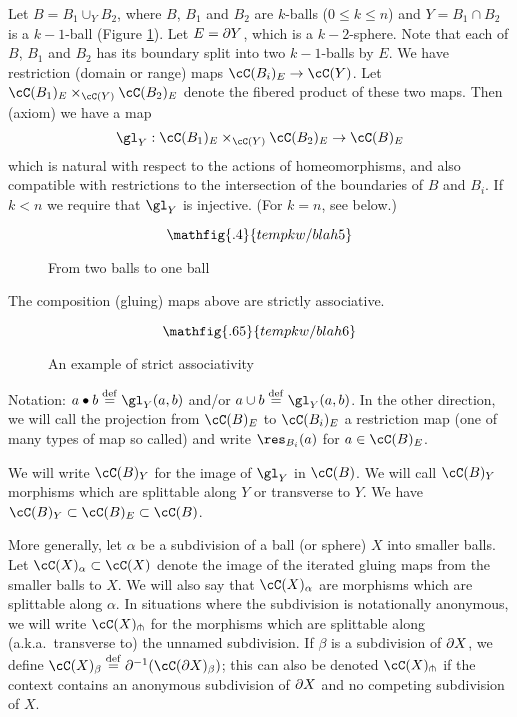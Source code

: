 \begin{axiom}[Composition]
Let $B = B_1 \cup_Y B_2$, where $B$, $B_1$ and $B_2$ are $k$-balls ($0\le k\le n$)
and $Y = B_1\cap B_2$ is a $k{-}1$-ball (Figure \ref{blah5}).
Let $E = \partial Y$, which is a $k{-}2$-sphere.
Note that each of $B$, $B_1$ and $B_2$ has its boundary split into two $k{-}1$-balls by $E$.
We have restriction (domain or range) maps $\cC(B_i)_E \to \cC(Y)$.
Let $\cC(B_1)_E \times_{\cC(Y)} \cC(B_2)_E$ denote the fibered product of these two maps. 
Then (axiom) we have a map
\[
	\gl_Y : \cC(B_1)_E \times_{\cC(Y)} \cC(B_2)_E \to \cC(B)_E
\]
which is natural with respect to the actions of homeomorphisms, and also compatible with restrictions
to the intersection of the boundaries of $B$ and $B_i$.
If $k < n$ we require that $\gl_Y$ is injective.
(For $k=n$, see below.)
\end{axiom}

\begin{figure}[!ht]
$$\mathfig{.4}{tempkw/blah5}$$
\caption{From two balls to one ball}\label{blah5}\end{figure}

\begin{axiom} \label{nca-assoc}
The composition (gluing) maps above are strictly associative.
\end{axiom}

\begin{figure}[!ht]
$$\mathfig{.65}{tempkw/blah6}$$
\caption{An example of strict associativity}\label{blah6}\end{figure}


Notation: $a\bullet b \deq \gl_Y(a, b)$ and/or $a\cup b \deq \gl_Y(a, b)$.
In the other direction, we will call the projection from $\cC(B)_E$ to $\cC(B_i)_E$ 
a restriction map (one of many types of map so called) and write $\res_{B_i}(a)$ for $a\in \cC(B)_E$.

We will write $\cC(B)_Y$ for the image of $\gl_Y$ in $\cC(B)$.
We will call $\cC(B)_Y$ morphisms which are splittable along $Y$ or transverse to $Y$.
We have $\cC(B)_Y \sub \cC(B)_E \sub \cC(B)$.

More generally, let $\alpha$ be a subdivision of a ball (or sphere) $X$ into smaller balls.
Let $\cC(X)_\alpha \sub \cC(X)$ denote the image of the iterated gluing maps from 
the smaller balls to $X$.
We will also say that $\cC(X)_\alpha$ are morphisms which are splittable along $\alpha$.
In situations where the subdivision is notationally anonymous, we will write
$\cC(X)\spl$ for the morphisms which are splittable along (a.k.a.\ transverse to)
the unnamed subdivision.
If $\beta$ is a subdivision of $\partial X$, we define $\cC(X)_\beta \deq \bd\inv(\cC(\bd X)_\beta)$;
this can also be denoted $\cC(X)\spl$ if the context contains an anonymous
subdivision of $\partial X$ and no competing subdivision of $X$.

